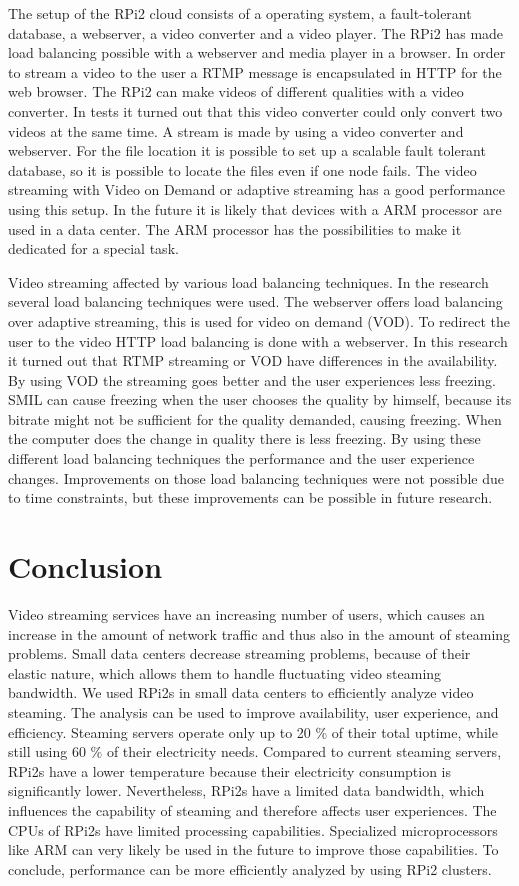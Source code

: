 \documentclass{sig-alternate-br}
\begin{document}
The setup of the RPi2 cloud consists of a operating system, a fault-tolerant database, a webserver, a video converter and a video player. The RPi2 has made load balancing possible with a webserver and media player in a browser. In order to stream a video to the user a RTMP message is encapsulated in HTTP for the web browser. 
The RPi2 can make videos of different qualities with a video converter. In tests it turned out that this video converter could only convert two videos at the same time. A stream is made by using a video converter and webserver. For the file location it is possible to set up a scalable fault tolerant database, so it is possible to locate the files even if one node fails.
The video streaming with Video on Demand or adaptive streaming has a good performance using this setup. In the future it is likely that devices with a ARM processor are used in a data center. The ARM processor has the possibilities to make it dedicated for a special task. 

Video streaming affected by various load balancing techniques. In the research several load balancing techniques were used. The webserver offers load balancing over adaptive streaming, this is used for video on demand (VOD). To redirect the user to the video HTTP load balancing is done with a webserver. In this research it turned out that RTMP streaming or VOD have differences in the availability. By using VOD the streaming goes better and the user experiences less freezing. SMIL can cause freezing when the user chooses the quality by himself, because its bitrate might not be sufficient for the quality demanded, causing freezing. When the computer does the change in quality there is less freezing. By using these different load balancing techniques the performance and the user experience changes. Improvements on those load balancing techniques were not possible due to time constraints, but these improvements can be possible in future research. 

\section{Conclusion}
Video streaming services have an increasing number of users, which causes an increase in the amount of network traffic and thus also in the amount of steaming problems. Small data centers decrease streaming problems, because of their elastic nature, which allows them to handle fluctuating video steaming bandwidth. We used RPi2s in small data centers to efficiently analyze video steaming. The analysis can be used to improve availability, user experience, and efficiency. Steaming servers operate only up to 20 \% of their total uptime, while still using 60 \% of their electricity needs. Compared to current steaming servers, RPi2s have a lower temperature because their electricity consumption is significantly lower. Nevertheless, RPi2s have a limited data bandwidth, which influences the capability of steaming and therefore affects user experiences. The CPUs of RPi2s have limited processing capabilities.  Specialized microprocessors like ARM can very likely be used in the future to improve those capabilities. To conclude, performance can be more efficiently analyzed by using RPi2 clusters.
\end{document}
